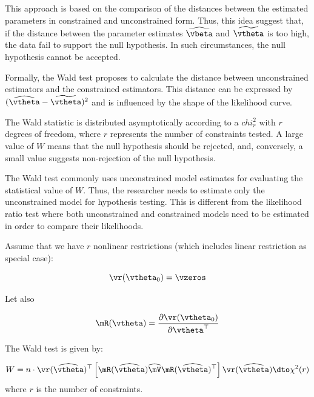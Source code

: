 \documentclass[english,12pt]{book}\usepackage[]{graphicx}\usepackage[]{xcolor}
\begin{document}
This approach is based on the comparison of the distances between the estimated parameters in constrained and unconstrained form. Thus, this idea suggest that, if the distance between the parameter estimates $\widehat{\vbeta}$ and $\widetilde{\vtheta}$ is too high, the data fail to support the null hypothesis. In such circumstances, the null hypothesis cannot be accepted. 

Formally, the Wald test proposes to calculate the distance between unconstrained estimators and the constrained estimators. This distance can be expressed by $(\widehat{\vtheta}-\widetilde{\vtheta})^2$ and is influenced by the shape of the likelihood curve. 

The Wald statistic is distributed asymptotically according to a $chi^2_{r}$ with $r$ degrees of freedom, where $r$ represents the number of constraints tested. A large value of $W$ means that the null hypothesis should be rejected, and, conversely, a small value suggests non-rejection of the null hypothesis. 

The Wald test commonly uses unconstrained model estimates for evaluating the statistical value of $W$. Thus, the researcher needs to estimate only the unconstrained model for hypothesis testing. This is different from the likelihood ratio test where both unconstrained and constrained models need to be estimated in order to compare their likelihoods. 

\begin{definition}
Assume that we have $r$ nonlinear restrictions (which includes linear restriction as special case):

\begin{equation*}
\vr(\vtheta_0) = \vzeros
\end{equation*}

Let also 

\begin{equation*}
\mR(\vtheta) = \frac{\partial \vr(\vtheta_0)}{\partial \vtheta^\top}
\end{equation*}

The Wald test is given by:

\begin{equation}\label{eq:wald_test_def}
W = n\cdot \vr(\widehat{\vtheta})^\top\left[\mR(\widehat{\vtheta}) \widehat{\mV}\mR(\widehat{\vtheta})^\top\right]\vr(\widehat{\vtheta})\dto \chi^2(r)
\end{equation}
%
where $r$ is the number of constraints. 
\end{definition}
\end{document}

